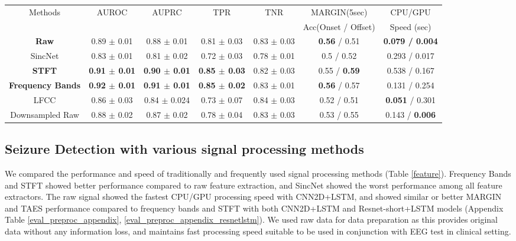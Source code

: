 \documentclass[pmlr,twocolumn,10pt]{jmlr}
\begin{document}
\begin{table*}[ht!]
	\footnotesize
	\centering
	\caption{Real-time seizure detection on bipolar TUH EEG dataset trained with each different signal process feature extractor on CNN2D + LSTM, averaged over $5$ runs. Please see Appendix section \ref{sec: speed} for CPU and GPU settings. Detailed results can be found in Appendix Table \ref{eval_preproc_appendix}.}
	\label{feature}
	\begin{tabular}{c|cccccc}
		\toprule
		Methods & AUROC & AUPRC & TPR & TNR & MARGIN(5sec)  &  CPU/GPU\\
		&&&&& Acc(Onset / Offset) & Speed (sec)\\
		\midrule
		\textbf{Raw} 
		& 0.89 $\pm$ 0.01
		& 0.88 $\pm$ 0.01 
		&  0.81 $\pm$ 0.03  
		&  0.83 $\pm$ 0.03
		& \textbf{0.56} / 0.51 
		& \textbf{0.079 / 0.004} \\
		SincNet 
		& 0.83 $\pm$ 0.01 
		& 0.81 $\pm$ 0.02 
		& 0.72 $\pm$ 0.03 
		& 0.78 $\pm$ 0.01 
		& 0.5 / 0.52 
		& 0.293 / 0.017 
		\\
		\textbf{STFT} 
		& \textbf{0.91 $\pm$ 0.01 }
		& \textbf{0.90 $\pm$ 0.01}
		& \textbf{0.85 $\pm$ 0.03 }
		& 0.82 $\pm$ 0.03 
		& 0.55 / \textbf{0.59} 
		& 0.538 / 0.167 
		\\
		
		\textbf{Frequency Bands} 
		& \textbf{0.92 $\pm$ 0.01}  
		& \textbf{0.91 $\pm$ 0.01} 
		& \textbf{0.85 $\pm$ 0.02} 
		& 0.83 $\pm$ 0.01 
		& \textbf{0.56} / 0.57 
		& 0.131 / 0.254 
		\\
		
		LFCC & 0.86 $\pm$ 0.03 & 0.84 $\pm$ 0.024 & 0.73 $\pm$ 0.07 & 0.84 $\pm$ 0.03 & 0.52 / 0.51 & \textbf{0.051} / 0.301 \\
		Downsampled Raw & 0.88 $\pm$ 0.02 & 0.87 $\pm$ 0.02 &  0.78 $\pm$ 0.04 &  0.83 $\pm$ 0.03 & 0.53 / 0.55 & 0.143 / \textbf{0.006} \\
		\bottomrule
	\end{tabular}
\end{table*} \subsection{Seizure Detection with various signal processing methods}
We compared the performance and speed of traditionally and frequently used signal processing methods (Table \ref{feature}). Frequency Bands and STFT showed better performance compared to raw feature extraction, and SincNet \citep{ravanelli2018speaker} showed the worst performance among all feature extractors. The raw signal showed the fastest CPU/GPU processing speed with CNN2D+LSTM, and showed similar or better MARGIN and TAES performance compared to frequency bands and STFT with both CNN2D+LSTM and Resnet-short+LSTM models (Appendix Table \ref{eval_preproc_appendix}, \ref{eval_preproc_appendix_resnetlstm}). We used raw data for data preparation as this provides original data without any information loss, and maintains fast processing speed suitable to be used in conjunction with EEG test in clinical setting.
\end{document}
